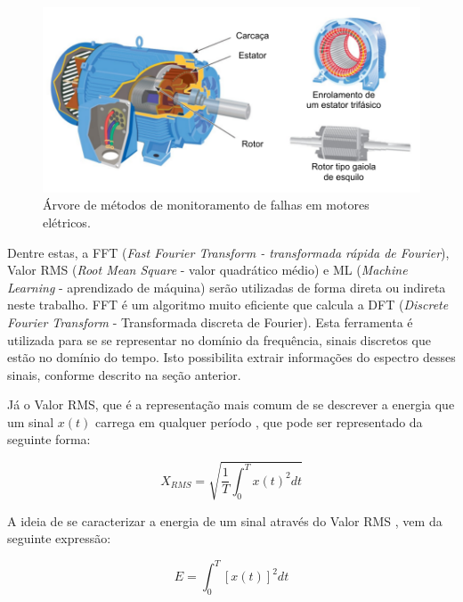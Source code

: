 \begin{figure}[H]
    \caption{Árvore de métodos de monitoramento de falhas em motores elétricos.}
    \begin{center}
        \includegraphics[scale=0.9, page=8]{referencial/img/imagens_referencial.pdf}
    \end{center}
    \label{fig:monitoring_methods_rilski_p78}
\end{figure}

Dentre estas, a FFT (\textit{Fast Fourier Transform - transformada rápida de Fourier}), Valor RMS (\textit{Root Mean Square} - valor quadrático 
médio) e ML (\textit{Machine Learning} - aprendizado de máquina) serão utilizadas de forma direta ou indireta neste trabalho.
FFT é um algoritmo muito eficiente que calcula a DFT (\textit{Discrete Fourier Transform} - Transformada  discreta de Fourier). Esta ferramenta 
é utilizada para se se representar no domínio da frequência, sinais discretos que estão no domínio do tempo. Isto 
possibilita extrair informações do espectro desses sinais, conforme descrito na seção anterior. 

Já o Valor RMS, que é a representação mais comum de se descrever a energia que um sinal  $x(t)$ carrega em qualquer período \cite{Cryer2010}, 
que pode ser representado da seguinte forma:

\begin{equation}\label{eq:rms_int}
    X_{RMS} = \sqrt{\frac{1}{T}\int_{0}^{T}{x(t)^2dt}}
\end{equation}

A ideia de se caracterizar a energia de um sinal através do Valor RMS \cite{Cryer2010}, vem da seguinte expressão:

\begin{equation}\label{eq:energia}
    E = \int_{0}^{T}{[x(t)]^2dt}
\end{equation}

